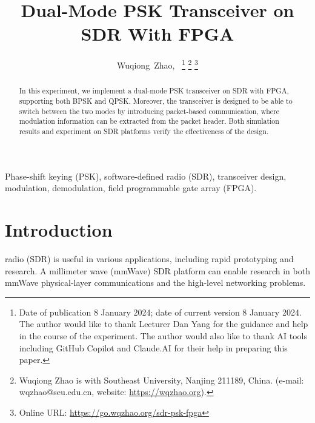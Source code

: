 \documentclass[journal,twoside]{IEEEtran}
\begin{document}
  \title{Dual-Mode PSK Transceiver on SDR With FPGA}

  \author{%
    Wuqiong~Zhao{\hspace{.1em}\textsuperscript{}},~
    \thanks{Date of publication 8 January 2024; date of current version 8 January 2024.
      The author would like to thank Lecturer Dan Yang for the guidance and help in the course of the experiment.
      The author would also like to thank AI tools including GitHub Copilot and Claude.AI for their help in preparing this paper.}
    \thanks{Wuqiong Zhao is with Southeast University, Nanjing 211189, China. (e-mail: wqzhao@seu.edu.cn, website: \url{https://wqzhao.org}).}
    \thanks{Online URL: \url{https://go.wqzhao.org/sdr-psk-fpga}}
  }


  \maketitle

  \begin{abstract}
    In this experiment, we implement a dual-mode PSK transceiver on SDR with FPGA,
    supporting both BPSK and QPSK.
    Moreover, the transceiver is designed to be able to switch between the two modes by introducing packet-based communication,
    where modulation information can be extracted from the packet header.
    Both simulation results and experiment on SDR platforms verify the effectiveness of the design.
  \end{abstract}
  \begin{IEEEkeywords}
    Phase-shift keying (PSK), software-defined radio (SDR), transceiver design, modulation, demodulation, field programmable gate array (FPGA).
  \end{IEEEkeywords}

  \section{Introduction}

     radio (SDR) is useful in various applications,
    including rapid prototyping and research.
    A millimeter wave (mmWave) SDR platform \cite{zhao2020m} can enable research in both mmWave physical-layer communications
    and the high-level networking problems.
\end{document}
